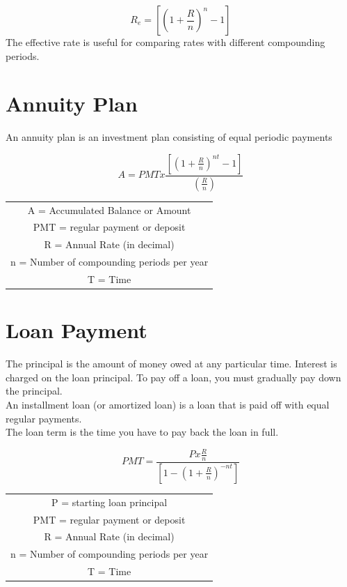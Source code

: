 \documentclass{article}
\begin{document}
		\begin{equation*}
			R_{e} = [(1 + \frac{R}{n})^{n} - 1] 
		\end{equation*}
		\newline
		The effective rate is useful for comparing rates with different compounding periods. 
		
		\section{Annuity Plan}
			An annuity plan is an investment plan consisting of equal periodic payments
			
			\begin{equation*}
				A = PMT x \frac{[(1 + \frac{R}{n})^{nt} - 1]}{(\frac{R}{n})}
			\end{equation*}
		
			\begin{table}[h!]
				\centering
				\begin{tabular}{|c|}
					\hline
					A = Accumulated Balance or Amount\\
					PMT  = regular payment  or deposit\\
					R = Annual Rate (in decimal)\\
					n = Number of compounding periods per year\\
					T = Time\\
					\hline
				\end{tabular}
			\end{table}
		
	
		\section{Loan Payment}
			The principal is the amount of money owed at any particular time. Interest is charged on the loan principal. To pay off a loan, you must gradually pay down the principal. \\
			An installment loan (or amortized loan) is a loan that is paid off with equal regular payments. \\
			The loan term is the time you have to pay back the loan in full.
			
			\begin{equation*}
				PMT = \frac{P x \frac{R}{n}}{[1 - (1 + \frac{R}{n})^{-nt}]}
			\end{equation*}
		
			
			\begin{table}[h!]
				\begin{center}
					\begin{tabular}{|c|}
						\hline
					P = starting loan principal\\
					PMT  = regular payment  or deposit\\
					R = Annual Rate (in decimal)\\
					n = Number of compounding periods per year\\
					T = Time\\
					\hline
					\end{tabular}
				\end{center}
			\end{table}
		
\end{document}
